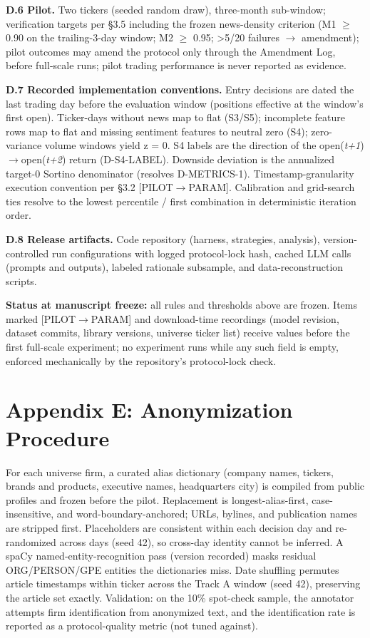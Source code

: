 \documentclass[
  12pt,
]{article}
\begin{document}
\textbf{D.6 Pilot.} Two tickers (seeded random draw), three-month
sub-window; verification targets per §3.5 including the frozen
news-density criterion (M1 \(\geq\) 0.90 on the trailing-3-day window;
M2 \(\geq\) 0.95; \textgreater5/20 failures \(\rightarrow\) amendment);
pilot outcomes may amend the protocol only through the Amendment Log,
before full-scale runs; pilot trading performance is never reported as
evidence.

\textbf{D.7 Recorded implementation conventions.} Entry decisions are
dated the last trading day before the evaluation window (positions
effective at the window's first open). Ticker-days without news map to
flat (S3/S5); incomplete feature rows map to flat and missing sentiment
features to neutral zero (S4); zero-variance volume windows yield z = 0.
S4 labels are the direction of the
open(\emph{t+1})\(\rightarrow\)open(\emph{t+2}) return (D-S4-LABEL).
Downside deviation is the annualized target-0 Sortino denominator
(resolves D-METRICS-1). Timestamp-granularity execution convention per
§3.2 {[}PILOT\(\rightarrow\)PARAM{]}. Calibration and grid-search ties
resolve to the lowest percentile / first combination in deterministic
iteration order.

\textbf{D.8 Release artifacts.} Code repository (harness, strategies,
analysis), version-controlled run configurations with logged
protocol-lock hash, cached LLM calls (prompts and outputs), labeled
rationale subsample, and data-reconstruction scripts.

\textbf{Status at manuscript freeze:} all rules and thresholds above are
frozen. Items marked {[}PILOT\(\rightarrow\)PARAM{]} and download-time
recordings (model revision, dataset commits, library versions, universe
ticker list) receive values before the first full-scale experiment; no
experiment runs while any such field is empty, enforced mechanically by
the repository's protocol-lock check.

\hypertarget{appendix-e-anonymization-procedure}{%
\section{Appendix E: Anonymization
Procedure}\label{appendix-e-anonymization-procedure}}

For each universe firm, a curated alias dictionary (company names,
tickers, brands and products, executive names, headquarters city) is
compiled from public profiles and frozen before the pilot. Replacement
is longest-alias-first, case-insensitive, and word-boundary-anchored;
URLs, bylines, and publication names are stripped first. Placeholders
are consistent within each decision day and re-randomized across days
(seed 42), so cross-day identity cannot be inferred. A spaCy
named-entity-recognition pass (version recorded) masks residual
ORG/PERSON/GPE entities the dictionaries miss. Date shuffling permutes
article timestamps within ticker across the Track A window (seed 42),
preserving the article set exactly. Validation: on the 10\% spot-check
sample, the annotator attempts firm identification from anonymized text,
and the identification rate is reported as a protocol-quality metric
(not tuned against).
\end{document}
